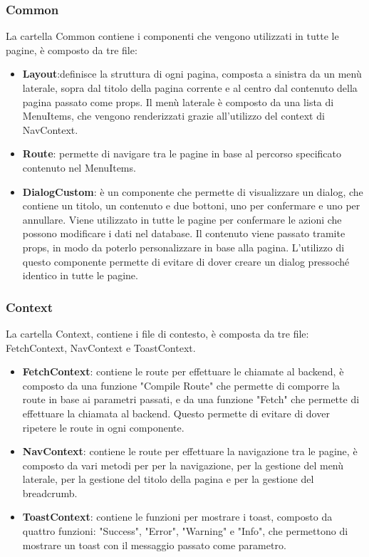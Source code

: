 \subsubsection{Common}
La cartella Common contiene i componenti che vengono utilizzati in tutte le pagine, è composto da tre file:
\begin{itemize}
    \item \textbf{Layout}:definisce la struttura di ogni pagina, composta a sinistra da un menù laterale, sopra dal titolo della pagina corrente e al centro dal contenuto della pagina passato come props.
    Il menù laterale è composto da una lista di MenuItems, che vengono renderizzati grazie all'utilizzo del context di NavContext.
    \item \textbf{Route}: permette di navigare tra le pagine in base al percorso specificato contenuto nel MenuItems.\\
    \item \textbf{DialogCustom}: è un componente che permette di visualizzare un dialog, che contiene un titolo, un contenuto e due bottoni, uno per confermare e uno per annullare. Viene utilizzato in tutte le pagine per confermare le azioni che possono modificare i dati nel database. Il contenuto viene passato tramite props, in modo da poterlo personalizzare in base alla pagina. L'utilizzo di questo componente permette di evitare di dover creare un dialog pressoché identico in tutte le pagine.\\
\end{itemize}
\subsubsection{Context}
La cartella Context, contiene i file di contesto, è composta da tre file: FetchContext, NavContext e ToastContext.
\begin{itemize}
    \item \textbf{FetchContext}: contiene le route per effettuare le chiamate al backend, è composto da una funzione "Compile Route" che permette di comporre la route in base ai parametri passati, e da una funzione "Fetch" che permette di effettuare la chiamata al backend. Questo permette di evitare di dover ripetere le route in ogni componente.\\
    \item \textbf{NavContext}: contiene le route per effettuare la navigazione tra le pagine, è composto da vari metodi per per la navigazione, per la gestione del menù laterale, per la gestione del titolo della pagina e per la gestione del breadcrumb. \\
    \item \textbf{ToastContext}: contiene le funzioni per mostrare i toast, composto da quattro funzioni: "Success", "Error", "Warning" e "Info", che permettono di mostrare un toast con il messaggio passato come parametro.\\
\end{itemize}
